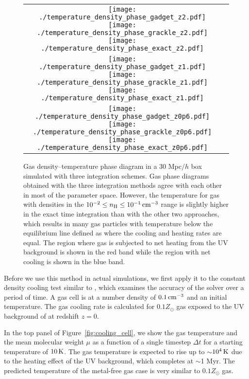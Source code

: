 \documentclass[a4paper,fleqn,usenatbib,useAMS, twocolumn]{mnras}
\begin{document}
\begin{figure*}
\begin{center}
\begin{tabular}{cc}
\texttt{[image: ./temperature\_density\_phase\_gadget\_z2.pdf]}
\texttt{[image: ./temperature\_density\_phase\_grackle\_z2.pdf]}
\texttt{[image: ./temperature\_density\_phase\_exact\_z2.pdf]}\\
\texttt{[image: ./temperature\_density\_phase\_gadget\_z1.pdf]}
\texttt{[image: ./temperature\_density\_phase\_grackle\_z1.pdf]}
\texttt{[image: ./temperature\_density\_phase\_exact\_z1.pdf]}\\
\texttt{[image: ./temperature\_density\_phase\_gadget\_z0p6.pdf]}
\texttt{[image: ./temperature\_density\_phase\_grackle\_z0p6.pdf]}
\texttt{[image: ./temperature\_density\_phase\_exact\_z0p6.pdf]}\\
\end{tabular}
\caption{\label{fig:gas_phase} 
Gas density--temperature phase diagram in a 30 Mpc$/h$ box simulated with three integration
schemes. Gas phase diagrams obtained with the three integration methods agree with each other 
in most of the parameter space. However, the temperature for gas with densities in the
$10^{-2} \le n_{\rm H} \le 10^{-1}\, \rm{cm^{-3}}$ range is slightly higher in the exact time 
integration than with the other two approaches, which results in many gas particles with
temperature below the equilibrium line defined as where the cooling and heating rates
are equal. 
The region where gas is subjected to net heating from the UV background is shown in the red band
while the region with net cooling is shown in the blue band.}
\end{center}
\end{figure*}

Before we use this method in actual simulations, we first apply it to
the constant density cooling test similar to \cite{Smith2016}, which
examines the accuracy of the solver over a period of time. A gas cell
is at a number density of $0.1\, \rm{cm}^{-3}$ and an initial
temperature. The gas cooling rate is calculated for $0.1Z_{\odot}$ gas
exposed to the UV background of \cite{Haardt2012} at redshift $z = 0$.

In the top panel of Figure~\ref{fig:cooling_cell}, we show the
gas temperature and the mean molecular weight $\mu$ as a
function of a single timestep $\Delta t$ for a starting
temperature of $10\, \rm{K}$. The gas temperature is expected to rise
up to $\sim$$10^4\, \rm{K}$ due to the heating effect of the UV
background, which completes at $\sim$1 Myr. The predicted
temperature of the metal-free gas case is very similar to
$0.1Z_{\odot}$ gas.
\end{document}

